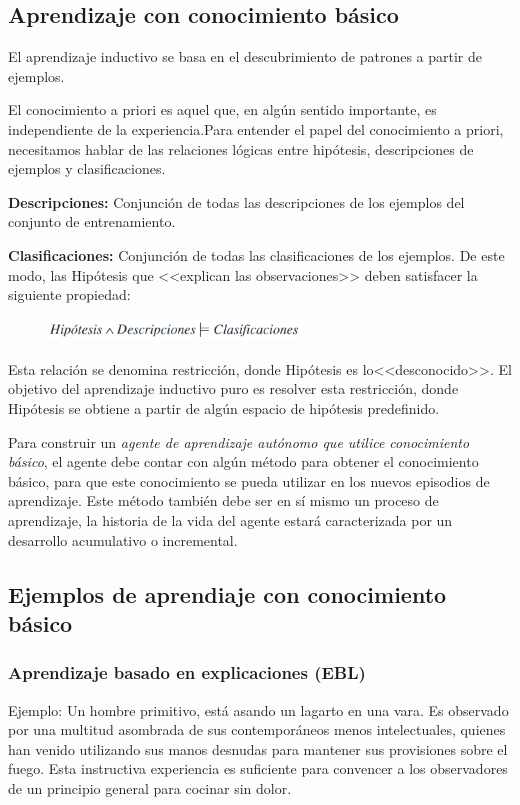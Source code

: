 \documentclass[12 pt, a4paper]{article}
\begin{document}
	 	\subsection{Aprendizaje con conocimiento básico}
	 		El aprendizaje inductivo se basa en el descubrimiento de patrones a partir de ejemplos.
			
			El conocimiento a priori es aquel que, en algún sentido importante, es independiente de la experiencia.Para entender el papel del conocimiento a priori, necesitamos hablar de las relaciones lógicas entre hipótesis, descripciones de ejemplos y clasificaciones.
			
			\textbf{Descripciones:} Conjunción de todas las descripciones de los ejemplos del conjunto de entrenamiento.
			
			\textbf{Clasificaciones:} Conjunción de todas las clasificaciones de los ejemplos.
De este modo, las Hipótesis que <<explican las observaciones>> deben satisfacer la siguiente propiedad:
				
				\begin{figure}[h]
					\centering
					\includegraphics[width=0.6\textwidth]{./section2/fig1.png}
				\end{figure}
			
			Esta relación se denomina restricción, donde Hipótesis es lo<<desconocido>>.  El objetivo del aprendizaje inductivo puro es resolver esta restricción, donde Hipótesis se obtiene a partir de algún espacio de hipótesis predefinido.
			
			Para construir un \emph{agente de aprendizaje autónomo que utilice conocimiento básico}, el agente debe contar con algún método para obtener el conocimiento básico, para que este conocimiento se pueda utilizar en los nuevos episodios de aprendizaje. Este método también debe ser en sí mismo un proceso de aprendizaje, la historia de la vida del agente estará caracterizada por un desarrollo acumulativo o incremental.
		\subsection{Ejemplos de aprendiaje con conocimiento básico}
			\subsubsection{Aprendizaje basado en explicaciones (EBL)}
			Ejemplo: Un hombre primitivo, está asando un lagarto en una vara. Es observado por una multitud asombrada de sus contemporáneos menos intelectuales, quienes han venido utilizando sus manos desnudas para mantener sus provisiones sobre el fuego. Esta instructiva experiencia es suficiente para convencer a los observadores de un principio general para cocinar sin dolor.
			
\end{document}
